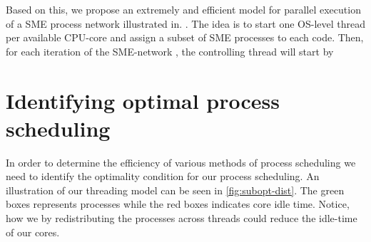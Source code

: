 Based on this, we propose an extremely and efficient model for
parallel execution of a SME process network illustrated
in. . The idea
is to start one OS-level thread per available CPU-core and assign a
subset of SME processes to each code. Then, for each iteration of the
SME-network , the controlling thread will start by 



\section{Identifying optimal process scheduling}
In order to determine the efficiency of various methods of process
scheduling we need to identify the optimality condition for our
process scheduling. An illustration of our threading model can be seen in
\cref{fig:subopt-dist}. The green boxes represents processes while the
red boxes indicates core idle time. Notice, how we by redistributing
the processes across threads could reduce the idle-time of our
cores.

